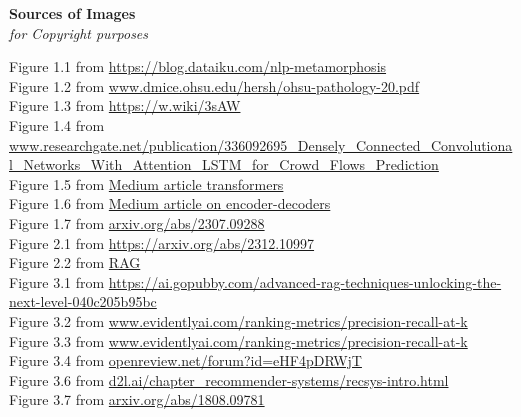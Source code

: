 \begin{landscape}
	\thispagestyle{empty}
	\begin{center}
		\Huge{\textbf{Sources of Images}} \\
		\normalsize{\textit{for Copyright purposes}}
	\end{center}
	Figure 1.1 from \url{https://blog.dataiku.com/nlp-metamorphosis} \\
	Figure 1.2 from \url{www.dmice.ohsu.edu/hersh/ohsu-pathology-20.pdf} \\
	Figure 1.3 from \url{https://w.wiki/3sAW} \\
	Figure 1.4 from \url{www.researchgate.net/publication/336092695_Densely_Connected_Convolutional_Networks_With_Attention_LSTM_for_Crowd_Flows_Prediction} \\
   Figure 1.5 from \href{https://www.medium.com/huggingface/encoder-decoders-in-transformers-a-hybrid-pre-trained-architecture-for-seq2seqaf4d7bf14bb8}{Medium article  transformers}\\
	Figure 1.6 from \href{https://medium.com/@anishnama20/exploring-the-power-of-encoder-decoder-models-pros-cons-and-applications-8bfbe2e66e76}{Medium article on encoder-decoders }	\\
	Figure 1.7 from \url{arxiv.org/abs/2307.09288} \\
	Figure 2.1 from \url{https://arxiv.org/abs/2312.10997} \\
	Figure 2.2 from \href{https://www.researchgate.net/figure/High-level-overview-of-a-possible-solution-using-RAG-and-a-multi-modal-in-context_fig1_380540048}{RAG } \\
   Figure 3.1 from \url{https://ai.gopubby.com/advanced-rag-techniques-unlocking-the-next-level-040c205b95bc} \\
	Figure 3.2 from \url{www.evidentlyai.com/ranking-metrics/precision-recall-at-k} \\
	Figure 3.3 from \url{www.evidentlyai.com/ranking-metrics/precision-recall-at-k} \\
	Figure 3.4 from \url{openreview.net/forum?id=eHF4pDRWjT} \\
	Figure 3.6 from \url{d2l.ai/chapter_recommender-systems/recsys-intro.html} \\
	Figure 3.7 from \url{arxiv.org/abs/1808.09781} \\
\end{landscape}
